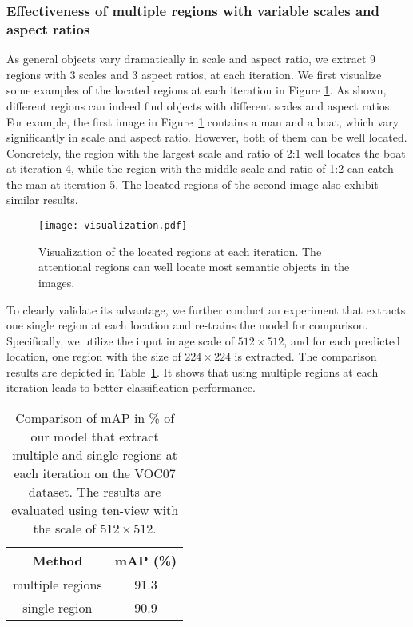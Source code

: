 \documentclass[letterpaper]{article} %
\begin{document}
\subsubsection{Effectiveness of multiple regions with variable scales and aspect ratios} 
As general objects vary dramatically in scale and aspect ratio, we extract 9 regions with 3 scales and 3 aspect ratios, at each iteration. We first visualize some examples of the located regions at each iteration in Figure \ref{fig:visualization}. As shown, different regions can indeed find objects with different scales and aspect ratios. For example, the first image in Figure~\ref{fig:visualization} contains a man and a boat, which vary significantly in scale and aspect ratio. However, both of them can be well located. Concretely, the region with the largest scale and ratio of 2:1 well locates the boat at iteration 4, while the region with the middle scale and ratio of 1:2 can catch the man at iteration 5. The located regions of the second image also exhibit similar results. 
\begin{figure}[htp]
   \centering
   \texttt{[image: visualization.pdf]}
   \caption{Visualization of the located regions at each iteration. The attentional regions can well locate most semantic objects in the images.}
   \label{fig:visualization}
\end{figure}

To clearly validate its advantage, we further conduct an experiment that extracts one single region at each location and re-trains the model for comparison. Specifically, we utilize the input image scale of $512\times512$, and for each predicted location, one region with the size of $224 \times 224$ is extracted. The comparison results are depicted in Table~\ref{table:anchor}. It shows that using multiple regions at each iteration leads to better classification performance. 

\begin{table}[htp]
\centering
\begin{tabular}{c|c}
\hline
\centering Method & mAP (\%)  \\
\hline 
\hline
\centering multiple regions & 91.3 \\
\centering single region & 90.9 \\
\hline
\end{tabular}
\caption{Comparison of mAP in \% of our model that extract multiple and single regions at each iteration on the VOC07 dataset. The results are evaluated using ten-view with the scale of $512\times 512$.}
\label{table:anchor}
\end{table}
\end{document}
